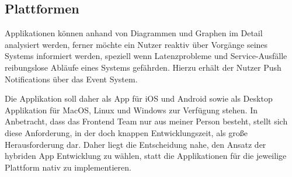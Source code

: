 \subsection{Plattformen}

Applikationen können anhand von Diagrammen und Graphen im Detail analysiert werden,
ferner möchte ein Nutzer reaktiv über Vorgänge seines Systems informiert werden, speziell wenn Latenzprobleme und Service-Ausfälle reibungslose Abläufe eines Systems gefährden.
Hierzu erhält der Nutzer Push Notifications über das Event System.

Die Applikation soll daher als App für iOS und Android sowie als Desktop Applikation für MacOS, Linux und Windows zur Verfügung stehen.
In Anbetracht, dass das Frontend Team nur aus meiner Person besteht, stellt sich diese Anforderung, in der doch knappen Entwicklungszeit, als große Herausforderung dar.
Daher liegt die Entscheidung nahe, den Ansatz der hybriden App Entwicklung zu wählen, statt die Applikationen für die jeweilige Plattform nativ zu implementieren.
